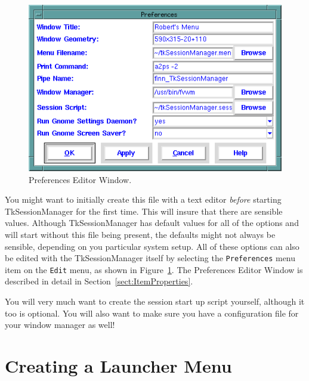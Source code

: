 \begin{figure}[hbpt]
\begin{centering}
\includegraphics[width=5in]{PreferencesEditor.png}
\caption{Preferences Editor Window.}
\label{tut:fig:preferenceseditor}
\end{centering}
\end{figure}
You might want to initially create this file with a text editor
\textit{before} starting TkSessionManager for the first time.  This will
insure that there are sensible values.  Although TkSessionManager has
default values for all of the options and will start without this file
being present, the defaults might not always be sensible, depending on
you particular system setup.  All of these options can also be edited
with the TkSessionManager itself by selecting the \texttt{Preferences}
menu item on the \texttt{Edit} menu, as shown in
Figure~\ref{tut:fig:preferenceseditor}. The Preferences Editor Window is
described in detail in Section~\ref{sect:ItemProperties}.

You will very much want to create the session start up script yourself,
although it too is optional.  You will also want to make sure you have a
configuration file for your window manager as well!

\section{Creating a Launcher Menu}

